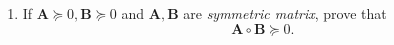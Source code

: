 \begin{enumerate}
\begin{enumerate}
\\
\item
If $\bm A\succeq0,\bm B\succeq0$ and $\bm A,\bm B$ are \textit{symmetric matrix}, prove that
\[
\bm A\circ\bm B\succeq0.
\]
\end{enumerate}
\end{enumerate}
